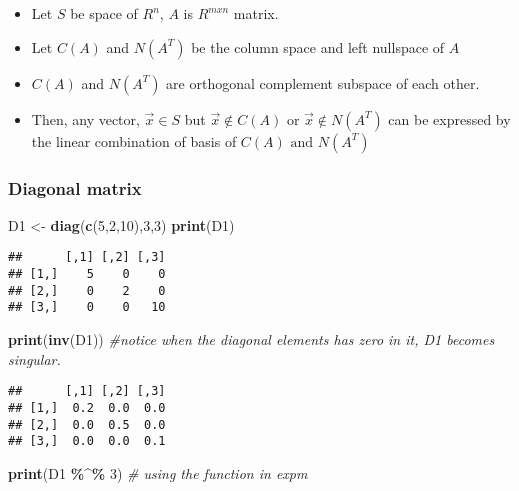 \documentclass[
]{article}
\newenvironment{Shaded}{\begin{snugshade}}{\end{snugshade}}
\newcommand{\CommentTok}[1]{\textcolor[rgb]{0.56,0.35,0.01}{\textit{#1}}}
\newcommand{\DecValTok}[1]{\textcolor[rgb]{0.00,0.00,0.81}{#1}}
\newcommand{\FunctionTok}[1]{\textcolor[rgb]{0.13,0.29,0.53}{\textbf{#1}}}
\newcommand{\NormalTok}[1]{#1}
\newcommand{\OtherTok}[1]{\textcolor[rgb]{0.56,0.35,0.01}{#1}}
\newcommand{\SpecialCharTok}[1]{\textcolor[rgb]{0.81,0.36,0.00}{\textbf{#1}}}
\providecommand{\tightlist}{%
  \setlength{\itemsep}{0pt}\setlength{\parskip}{0pt}}
\begin{document}
\begin{itemize}
\tightlist
\item
  Let \(S\) be space of \(R^n\), \(A\) is \(R^{mxn}\) matrix.
\item
  Let \(C(A)\) and \(N(A^T)\) be the column space and left nullspace of
  \(A\)
\item
  \(C(A)\) and \(N(A^T)\) are orthogonal complement subspace of each
  other.
\item
  Then, any vector, \(\vec{x} \in S\) but
  \(\vec{x} \notin C(A) \text{ or } \vec{x} \notin N(A^T)\) can be
  expressed by the linear combination of basis of
  \(C(A) \text{ and } N(A^T)\)
\end{itemize}

\hypertarget{diagonal-matrix}{%
\subsubsection{Diagonal matrix}\label{diagonal-matrix}}

\begin{Shaded}
\begin{Highlighting}[]
\NormalTok{D1 }\OtherTok{\textless{}{-}} \FunctionTok{diag}\NormalTok{(}\FunctionTok{c}\NormalTok{(}\DecValTok{5}\NormalTok{,}\DecValTok{2}\NormalTok{,}\DecValTok{10}\NormalTok{),}\DecValTok{3}\NormalTok{,}\DecValTok{3}\NormalTok{)}
\FunctionTok{print}\NormalTok{(D1)}
\end{Highlighting}
\end{Shaded}

\begin{verbatim}
##      [,1] [,2] [,3]
## [1,]    5    0    0
## [2,]    0    2    0
## [3,]    0    0   10
\end{verbatim}

\begin{Shaded}
\begin{Highlighting}[]
\FunctionTok{print}\NormalTok{(}\FunctionTok{inv}\NormalTok{(D1)) }\CommentTok{\#notice when the diagonal elements has zero in it, D1 becomes singular.}
\end{Highlighting}
\end{Shaded}

\begin{verbatim}
##      [,1] [,2] [,3]
## [1,]  0.2  0.0  0.0
## [2,]  0.0  0.5  0.0
## [3,]  0.0  0.0  0.1
\end{verbatim}

\begin{Shaded}
\begin{Highlighting}[]
\FunctionTok{print}\NormalTok{(D1 }\SpecialCharTok{\%\^{}\%} \DecValTok{3}\NormalTok{) }\CommentTok{\# using the function in expm}
\end{Highlighting}
\end{Shaded}
\end{document}
